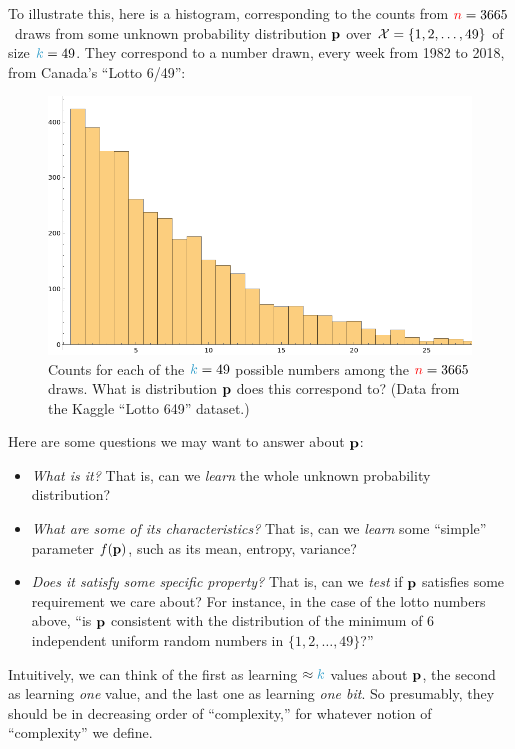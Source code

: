 To illustrate this, here is a histogram, corresponding to the counts from ${\textcolor{red}{n}}=3665$ \iid\ draws from some unknown probability distribution $\mathbf{p}$ over $\mathcal{X} = \{1,2,\dots,49\}$ of size $\ab=49$. They correspond to a number drawn, every week from 1982 to 2018, from Canada's ``Lotto 6/49'':
\begin{figure}[htbp]
    \centering
    \includegraphics[width=0.925\linewidth]{figures/fig-lotto-minofsix.png}
    \caption{Counts for each of the $\ab=49$ possible numbers among the ${\textcolor{red}{n}}=3665$ draws. What is distribution $\mathbf{p}$ does this correspond to? (Data from the Kaggle ``Lotto 649'' dataset.)}
    \label{fig:enter-label} %
\end{figure}
\noindent Here are some questions we may want to answer about $\mathbf{p}$:
\begin{itemize}
    \item \emph{What is it?} That is, can we \emph{learn} the whole unknown probability distribution?
    \item \emph{What are some of its characteristics?} That is, can we \emph{learn} some ``simple'' parameter $f(\mathbf{p})$, such as its mean, entropy, variance?
    \item \emph{Does it satisfy some specific property?} That is, can we \emph{test} if $\mathbf{p}$ satisfies some requirement we care about? For instance, in the case of the lotto numbers above, ``{is $\mathbf{p}$ consistent with the distribution of the minimum of 6 independent uniform random numbers in $\{1,2,\dots, 49\}$?}''
\end{itemize}
Intuitively, we can think of the first as learning $\approx \ab$ values about $\mathbf{p}$, the second as learning \emph{one} value, and the last one as learning \emph{one bit}. So presumably, they should be in decreasing order of ``complexity,'' for whatever notion of ``complexity'' we define.


